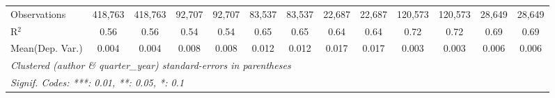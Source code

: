 \begin{tabular}{lcccccccccccc}
   Observations                             & 418,763       & 418,763        & 92,707   & 92,707       & 83,537       & 83,537        & 22,687  & 22,687        & 120,573  & 120,573   & 28,649  & 28,649\\  
   R$^2$                                    & 0.56          & 0.56           & 0.54     & 0.54         & 0.65         & 0.65          & 0.64    & 0.64          & 0.72     & 0.72      & 0.69    & 0.69\\  
Mean(Dep. Var.) & 0.004 & 0.004 & 0.008 & 0.008 & 0.012 & 0.012 & 0.017 & 0.017 & 0.003 & 0.003 & 0.006 & 0.006 \\
   \midrule \midrule
   \multicolumn{13}{l}{\emph{Clustered (author \& quarter\_year) standard-errors in parentheses}}\\
   \multicolumn{13}{l}{\emph{Signif. Codes: ***: 0.01, **: 0.05, *: 0.1}}\\
\end{tabular}
\par\endgroup
